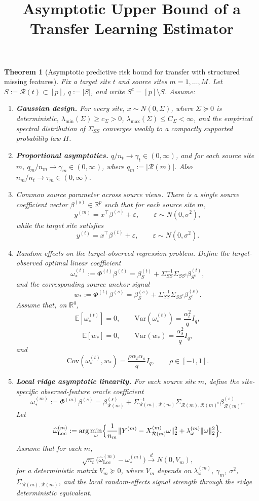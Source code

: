 \documentclass[11pt]{article}
\title{Asymptotic Upper Bound of a Transfer Learning Estimator}
\author{}
\date{}
\newcommand{\1}{\mathbf{1}}
\newtheorem{theorem}{Theorem}
\begin{document}
\begin{theorem}[Asymptotic predictive risk bound for transfer with structured missing features]
\label{thm:main}
Fix a target site \(t\) and source sites \(m=1,\dots,M\). Let \(S:=\mathcal R(t)\subset[p]\),
\(q:=|S|\), and write \(S^c=[p]\setminus S\). Assume:

\begin{enumerate}
\item[(A1)] \textbf{Gaussian design.}
For every site, \(x\sim N(0,\Sigma)\), where \(\Sigma\succeq 0\) is deterministic,
\(\lambda_{\min}(\Sigma)\ge c_\Sigma>0\), \(\lambda_{\max}(\Sigma)\le C_\Sigma<\infty\), and
the empirical spectral distribution of \(\Sigma_{SS}\) converges weakly to a compactly supported
probability law \(H\).

\item[(A2)] \textbf{Proportional asymptotics.}
\(q/n_t\to \gamma_t\in(0,\infty)\), and for each source site \(m\),
\(q_m/n_m\to \gamma_m\in(0,\infty)\), where \(q_m:=|\mathcal R(m)|\).
Also \(n_m/n_t\to \tau_m\in(0,\infty)\).

\item[(A3)] Common source parameter across source views.
There is a single source coefficient vector \(\beta^{(s)}\in\mathbb R^p\) such that
for each source site \(m\),
\[
y^{(m)}=x^\top \beta^{(s)}+\varepsilon,\qquad \varepsilon\sim N(0,\sigma^2),
\]
while the target site satisfies
\[
y^{(t)}=x^\top \beta^{(t)}+\varepsilon,\qquad \varepsilon\sim N(0,\sigma^2).
\]

\item[(A4)] Random effects on the target-observed regression problem.
Define the target-observed optimal linear coefficient
\[
\omega_*^{(t)}:=\Phi^{(t)}\beta^{(t)}
=\beta^{(t)}_{S}+\Sigma_{SS}^{-1}\Sigma_{S S^c}\beta^{(t)}_{S^c},
\]
and the corresponding source anchor signal
\[
w_*:=\Phi^{(t)}\beta^{(s)}
=\beta^{(s)}_{S}+\Sigma_{SS}^{-1}\Sigma_{S S^c}\beta^{(s)}_{S^c}.
\]
Assume that, on \(\mathbb R^q\),
\[
\mathbb E[\omega_*^{(t)}]=0,\qquad
\mathrm{Var}(\omega_*^{(t)})=\frac{\alpha_t^2}{q}I_q,
\]
\[
\mathbb E[w_*]=0,\qquad
\mathrm{Var}(w_*)=\frac{\alpha_s^2}{q}I_q,
\]
and
\[
\mathrm{Cov}(\omega_*^{(t)},w_*)=\frac{\rho\alpha_t\alpha_s}{q}I_q,
\qquad \rho\in[-1,1].
\]

\item[(A5)] \textbf{Local ridge asymptotic linearity.}
For each source site \(m\), define the site-specific observed-feature oracle coefficient
\[
\omega_*^{(m)}:=\Phi^{(m)}\beta^{(s)}
=\beta^{(s)}_{\mathcal R(m)}+\Sigma_{\mathcal R(m),\mathcal R(m)}^{-1}
\Sigma_{\mathcal R(m),\mathcal R(m)^c}\beta^{(s)}_{\mathcal R(m)^c}.
\]
Let
\[
\widehat\omega_{\mathrm{Loc}}^{(m)}
:=\arg\min_\omega\Bigl\{\frac1{n_m}\|Y^{(m)}-X_{\mathcal R(m)}^{(m)}\omega\|_2^2
+\lambda_\omega^{(m)}\|\omega\|_2^2\Bigr\}.
\]
Assume that for each \(m\),
\[
\sqrt{n_t}\bigl(\widehat\omega_{\mathrm{Loc}}^{(m)}-\omega_*^{(m)}\bigr)
\overset{d}{\longrightarrow}N(0,V_m),
\]
for a deterministic matrix \(V_m\succeq 0\), where \(V_m\) depends on
\(\lambda_\omega^{(m)}\), \(\gamma_m\), \(\sigma^2\), \(\Sigma_{\mathcal R(m),\mathcal R(m)}\),
and the local random-effects signal strength through the ridge deterministic equivalent.


\end{enumerate}
\end{theorem}
\end{document}
